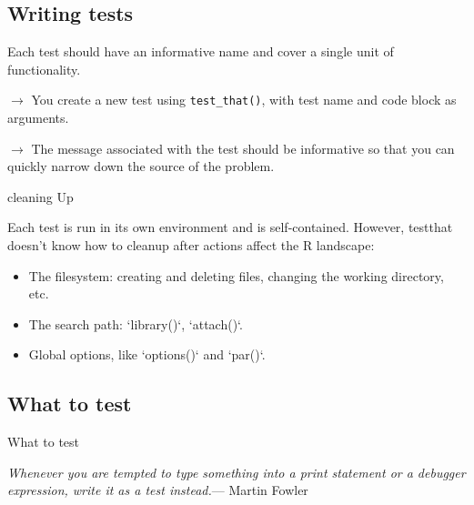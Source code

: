 \documentclass[12pt,handout]{beamer}
\begin{document}
\begin{frame}[fragile]{}

\section{Writing tests}

Each test should have an informative name and cover a single unit of functionality. 

$\rightarrow$ You create a new test using \texttt{test\_that()}, with test name and code block as arguments.

$\rightarrow$ The message associated with the test should be informative so that you can quickly narrow down the source of the problem.

\end{frame}


\begin{frame}[fragile]{cleaning Up}

Each test is run in its own environment and is self-contained. However, testthat doesn't know how to cleanup after actions affect the R landscape: 

\begin{itemize}
\item The filesystem: creating and deleting files, changing the working directory,
  etc.

\item The search path: `library()`, `attach()`.

\item Global options, like `options()` and `par()`.

\end{itemize}



\subsection{What to test}
\end{frame}


\begin{frame}[fragile]{What to test}

\textit{Whenever you are tempted to type something into a print statement or a 
debugger expression, write it as a test instead.}--- Martin Fowler

\end{frame}
\end{document}
